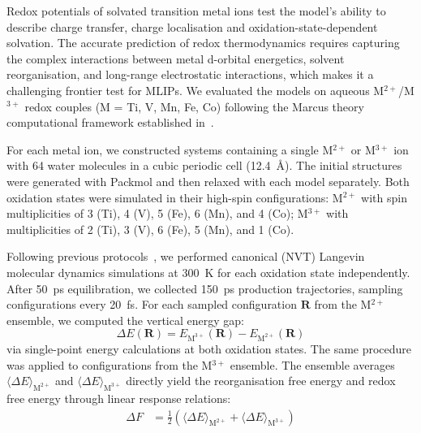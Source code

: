 \documentclass[aps,%
superscriptaddress,
 amsmath,amssymb,
floatfix,
twocolumn
]{revtex4-2}
\begin{document}
Redox potentials of solvated transition metal ions test the model's ability to describe charge transfer, charge localisation and oxidation-state-dependent solvation. The accurate prediction of redox thermodynamics requires capturing the complex interactions between metal d-orbital energetics, solvent reorganisation, and long-range electrostatic interactions, which makes it a challenging frontier test for MLIPs. We evaluated the models on aqueous M$^{2+}$/M$^{3+}$ redox couples (M = Ti, V, Mn, Fe, Co) following the Marcus theory computational framework established in~\cite{Blumberger2005, Mandal2022}.

For each metal ion, we constructed systems containing a single M$^{2+}$ or M$^{3+}$ ion with 64 water molecules in a cubic periodic cell (12.4~Å). The initial structures were generated with Packmol \cite{packmol} and then relaxed with each model separately. Both oxidation states were simulated in their high-spin configurations: M$^{2+}$ with spin multiplicities of 3 (Ti), 4 (V), 5 (Fe), 6 (Mn), and 4 (Co); M$^{3+}$ with multiplicities of 2 (Ti), 3 (V), 6 (Fe), 5 (Mn), and 1 (Co).

Following previous protocols~\cite{Mandal2022}, we performed canonical (NVT) Langevin molecular dynamics simulations at 300~K for each oxidation state independently. After 50~ps equilibration, we collected 150~ps production trajectories, sampling configurations every 20~fs. For each sampled configuration $\mathbf{R}$ from the M$^{2+}$ ensemble, we computed the vertical energy gap:
\begin{equation}
\Delta E(\mathbf{R}) = E_{\text{M}^{3+}}(\mathbf{R}) - E_{\text{M}^{2+}}(\mathbf{R})
\end{equation}
via single-point energy calculations at both oxidation states. The same procedure was applied to configurations from the M$^{3+}$ ensemble. The ensemble averages $\langle \Delta E \rangle_{\text{M}^{2+}}$ and $\langle \Delta E \rangle_{\text{M}^{3+}}$ directly yield the reorganisation free energy and redox free energy through linear response relations:
\begin{align}
\Delta F &= \frac{1}{2}\left(\langle \Delta E \rangle_{\text{M}^{2+}} + \langle \Delta E \rangle_{\text{M}^{3+}}\right) \label{eq:deltaF}
\end{align}
\end{document}
